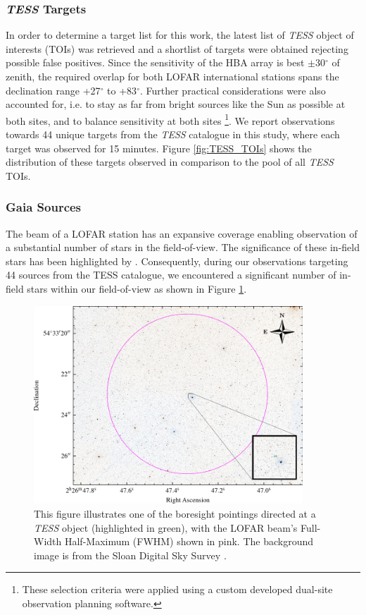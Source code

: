 \subsubsection{\textit{TESS} Targets} In order to determine a target list for this work, the latest list of \textit{TESS} object of interests (TOIs) was retrieved \citep{NEA12} and a shortlist of targets were obtained rejecting possible false positives. Since the sensitivity of the HBA array is best $\pm$30$^\circ$ of zenith, the required overlap for both LOFAR international stations spans the declination range +27$^\circ$ to +83$^\circ$. Further practical considerations were also accounted for, i.e. to stay as far from bright sources like the Sun as possible at both sites, and to balance sensitivity at both sites \citep{D-SOP}\footnote{These selection criteria were applied using a custom developed dual-site observation planning software.}. We report observations towards 44 unique targets from the \textit{TESS} catalogue in this study, where each target was observed for 15 minutes. Figure \ref{fig:TESS_TOIs} shows the distribution of these targets observed in comparison to the pool of all \textit{TESS} TOIs. 

\subsubsection{Gaia Sources}
The beam of a LOFAR station has an expansive coverage enabling observation of a substantial number of stars in the field-of-view. The significance of these in-field stars has been highlighted by \cite{Bart-Wlodarczyk-Sroka}. Consequently, during our observations targeting 44 sources from the TESS catalogue, we encountered a significant number of in-field stars within our field-of-view as shown in Figure \ref{fig:inbeam_trgts_SDSS}. 

\begin{figure}
    \centering
    \includegraphics[width = 0.9\textwidth]{SETI/figures/EIRP_plots/frame.png}
    \caption{This figure illustrates one of the boresight pointings directed at a \textit{TESS} object (highlighted in green), with the LOFAR beam's Full-Width Half-Maximum (FWHM) shown in pink. The background image is from the Sloan Digital Sky Survey \citep[SDSS;]{SDSSDR13}.}
    \label{fig:inbeam_trgts_SDSS}
\end{figure}


